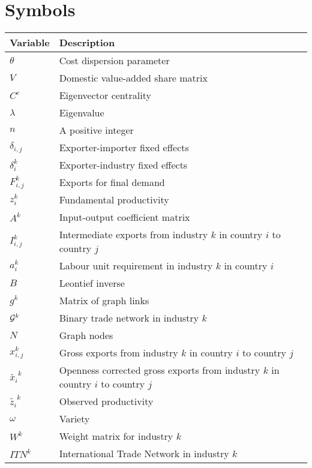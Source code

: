 \documentclass[11pt,leqno,a4paper]{scrbook}
\begin{document}
\chapter*{Symbols}\label{sv}
\footnotesize
\begin{tabular}[h]{ll}
Variable & Description \\ \midrule
  $\theta$ & Cost dispersion parameter \\
$V$ & Domestic value-added share matrix \\
 $C^e$ & Eigenvector centrality \\
  $\lambda$  & Eigenvalue\\
$n$ & A positive integer \\
$\delta_{i,j}$& Exporter-importer fixed effects \\
$\delta^k_i$ & Exporter-industry fixed effects \\
  $F^k_{i,j}$& Exports for final demand \\
  $z_i^k$ & Fundamental productivity \\
  $A^k$ & Input-output coefficient matrix \\
 $I^k_{i,j}$ & Intermediate exports from  industry $k$ in country $i$ to country $j$   \\
$a^k_i $ & Labour unit requirement in industry $k$ in country $i$ \\
$B$ & Leontief inverse \\
$g^k$ & Matrix of graph links \\
$\mathcal{G}^k$ & Binary trade network in industry $k$ \\
$N$ & Graph nodes \\
$x^k_{i,j} $ & Gross exports from  industry $k$ in country $i$ to country $j$  \\
$\tilde{x_i}^k $ & Openness corrected gross exports from  industry $k$ in country $i$ to country $j$   \\
 $\tilde{z_i}^k$& Observed productivity \\
  $\omega$ & Variety \\
 $W^k$ & Weight matrix for industry $k$ \\
$ITN^k$& International Trade Network in industry $k$ \\ \bottomrule
\end{tabular}
\end{document}
